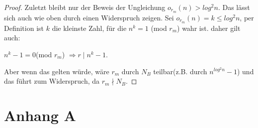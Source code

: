 \documentclass[12pt,oneside]{article}
\theoremstyle{remark}
\theoremstyle{definition}
\begin{document}
\begin{proof}
Zuletzt bleibt nur der Beweis der Ungleichung $o_{r_{m}}(n) > log^2 n$. Das lässt sich auch wie oben durch einen Widerspruch zeigen. Sei $o_{r_{m}}(n) = k \leq log^2 n$, per Definition ist $k$ die kleinste Zahl, für die $n^k = 1$ (mod $r_{m}$) wahr ist. daher gilt auch:\newline\newline
\centerline{$n^k - 1 = 0 $(mod  $r_{m}$) $\Rightarrow r \mid n^k - 1$.}

Aber wenn das gelten würde, wäre $r_{m}$ durch $N_{B}$ teilbar(z.B. durch $n^{log^2 n} -1$) und das führt zum Widerspruch, da $r_{m} \nmid N_{B}$. 
\end{proof}


\clearpage
\lhead{}
\printbibliography
{}


\clearpage
\appendix
\section{Anhang A}


\end{document}
